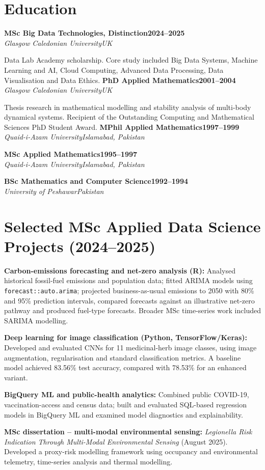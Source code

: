 \documentclass[10pt,a4paper]{article}
\newcommand{\cvrole}[4]{\textbf{#1}\hfill\textbf{#2}\\[-1pt]\textit{#3}\hfill\textit{#4}\par}
\begin{document}
\section{Education}
\cvrole{MSc Big Data Technologies, Distinction}{2024--2025}{Glasgow Caledonian University}{UK}
Data Lab Academy scholarship. Core study included Big Data Systems, Machine Learning and AI, Cloud Computing, Advanced Data Processing, Data Visualisation and Data Ethics.
\cvrole{PhD Applied Mathematics}{2001--2004}{Glasgow Caledonian University}{UK}
Thesis research in mathematical modelling and stability analysis of multi-body dynamical systems. Recipient of the Outstanding Computing and Mathematical Sciences PhD Student Award.
\cvrole{MPhil Applied Mathematics}{1997--1999}{Quaid-i-Azam University}{Islamabad, Pakistan}
\cvrole{MSc Applied Mathematics}{1995--1997}{Quaid-i-Azam University}{Islamabad, Pakistan}
\cvrole{BSc Mathematics and Computer Science}{1992--1994}{University of Peshawar}{Pakistan}

\section{Selected MSc Applied Data Science Projects (2024--2025)}
\textbf{Carbon-emissions forecasting and net-zero analysis (R):} Analysed historical fossil-fuel emissions and population data; fitted ARIMA models using \texttt{forecast::auto.arima}; projected business-as-usual emissions to 2050 with 80\% and 95\% prediction intervals, compared forecasts against an illustrative net-zero pathway and produced fuel-type forecasts. Broader MSc time-series work included SARIMA modelling.

\textbf{Deep learning for image classification (Python, TensorFlow/Keras):} Developed and evaluated CNNs for 11 medicinal-herb image classes, using image augmentation, regularisation and standard classification metrics. A baseline model achieved 83.56\% test accuracy, compared with 78.53\% for an enhanced variant.

\textbf{BigQuery ML and public-health analytics:} Combined public COVID-19, vaccination-access and census data; built and evaluated SQL-based regression models in BigQuery ML and examined model diagnostics and explainability.

\textbf{MSc dissertation -- multi-modal environmental sensing:} \textit{Legionella Risk Indication Through Multi-Modal Environmental Sensing} (August 2025). Developed a proxy-risk modelling framework using occupancy and environmental telemetry, time-series analysis and thermal modelling.
\end{document}
